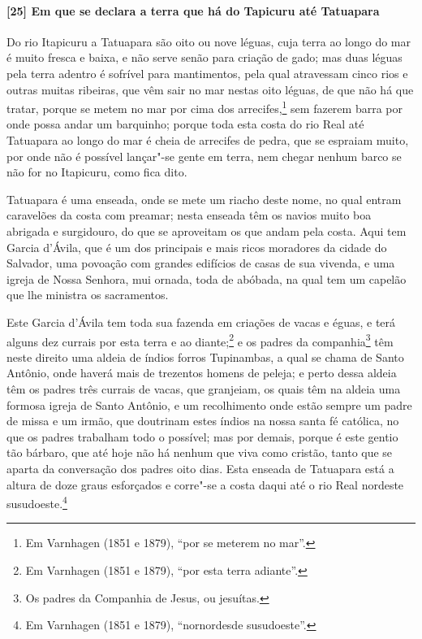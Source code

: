 \paragraph{[25] Em que se declara a terra que há do Tapicuru até Tatuapara} \quad
Do rio Itapicuru a Tatuapara são oito ou nove léguas, cuja terra ao longo do mar é muito
fresca e baixa, e não serve senão para criação de gado; mas duas léguas pela terra adentro
é sofrível para mantimentos, pela qual atravessam cinco rios e outras muitas ribeiras, que
vêm sair no mar nestas oito léguas, de que não há que tratar, porque se metem no mar por
cima dos arrecifes,\footnote{ Em Varnhagen (1851 e 1879), ``por se meterem no mar''.} sem
fazerem barra por onde possa andar um barquinho; porque toda esta costa do rio Real até
Tatuapara ao longo do mar é cheia de arrecifes de pedra, que se espraiam muito, por onde
não é possível lançar"-se gente em terra, nem chegar nenhum barco se não for no Itapicuru,
como fica dito.

Tatuapara é uma enseada, onde se mete um riacho deste nome, no qual entram caravelões da
costa com preamar; nesta enseada têm os navios muito boa abrigada e surgidouro, do que se
aproveitam os que andam pela costa. Aqui tem Garcia d'Ávila, que é um dos principais e
mais ricos moradores da cidade do Salvador, uma povoação com grandes edifícios de casas de
sua vivenda, e uma igreja de Nossa Senhora, mui ornada, toda de abóbada, na qual tem um
capelão que lhe ministra os sacramentos.

Este Garcia d'Ávila tem toda sua fazenda em criações de vacas e éguas, e terá alguns dez
currais por esta terra e ao diante;\footnote{ Em Varnhagen (1851 e 1879), ``por esta terra
adiante''.} e os padres da companhia\footnote{ Os padres da Companhia de Jesus, ou
jesuítas.} têm neste direito uma aldeia de índios forros Tupinambas, a qual se chama de
Santo Antônio, onde haverá mais de trezentos homens de peleja; e perto dessa aldeia têm os
padres três currais de vacas, que granjeiam, os quais têm na aldeia uma formosa igreja de
Santo Antônio, e um recolhimento onde estão sempre um padre de missa e um irmão, que
doutrinam estes índios na nossa santa fé católica, no que os padres trabalham todo o
possível; mas por demais, porque é este gentio tão bárbaro, que até hoje não há nenhum que
viva como cristão, tanto que se aparta da conversação dos padres oito dias. Esta enseada
de Tatuapara está a altura de doze graus esforçados e corre"-se a costa daqui até o rio
Real nordeste susudoeste.\footnote{ Em Varnhagen (1851 e 1879), ``nornordesde
susudoeste''.}

